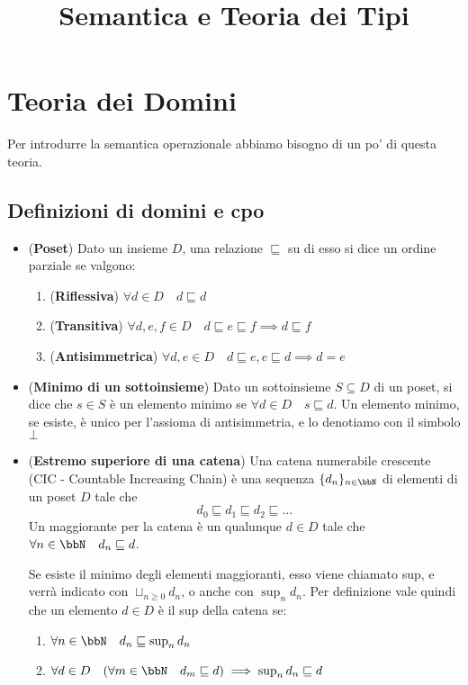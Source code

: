 \documentclass[a4paper,NoNotes,GeneralMath]{stdmdoc}
\newcommand{\sle}{\sqsubseteq}
\begin{document}
\title{Semantica e Teoria dei Tipi}

\section*{Teoria dei Domini}
Per introdurre la semantica operazionale abbiamo bisogno di un po' di
questa teoria.

\subsection*{Definizioni di domini e cpo}
\begin{itemize}
\item ({\bf Poset}) Dato un insieme $D$, una relazione $\sle$ su di esso si dice un ordine parziale se valgono:
  \begin{enumerate}
  \item ({\bf Riflessiva}) $\forall d \in D \quad d \sle d$
  \item ({\bf Transitiva}) $\forall d, e, f \in D \quad d \sle e \sle f \implies d \sle f$
  \item ({\bf Antisimmetrica}) $\forall d, e \in D \quad d \sle e, e \sle d \implies d = e$
  \end{enumerate}
\item ({\bf Minimo di un sottoinsieme}) Dato un sottoinsieme $S \subseteq D$ di un poset, si dice che $s \in S$ è un elemento minimo se $\forall d \in D \quad s \sle d$.
  Un elemento minimo, se esiste, è unico per l'assioma di antisimmetria, e lo denotiamo con il simbolo $\bot$
\item ({\bf Estremo superiore di una catena}) Una catena numerabile crescente (CIC - Countable Increasing Chain) è una sequenza $\{ d_n \}_{n \in \bbN}$ di elementi di un poset $D$ tale che
  $$ d_0 \sle d_1 \sle d_2 \sle \ldots $$
  Un maggiorante per la catena è un qualunque $d \in D$ tale che $\forall n \in \bbN \quad d_n \sle d$.
  
  Se esiste il minimo degli elementi maggioranti, esso viene chiamato sup, e verrà indicato con $\sqcup_{n \ge 0} d_n$, o anche con $\sup_n d_n$.
  Per definizione vale quindi che un elemento $d \in D$ è il sup della catena se:
  \begin{enumerate}
  \item $\forall n \in \bbN \quad d_n \sle \sup_n d_n$
  \item $\forall d \in D \quad (\forall m \in \bbN \quad d_m \sle d) \implies \sup_n d_n \sle d$
  \end{enumerate}
  

\end{itemize}
\end{document}
